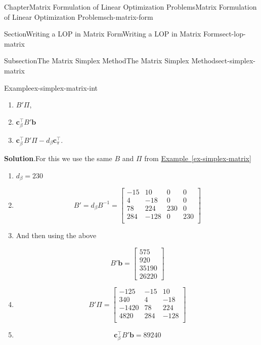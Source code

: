 \documentclass[oneside,10pt,]{book}
\newcommand{\blocktitlefont}{\relax}
\newcommand{\xreffont}{\relax}
\numberwithin{equation}{section}
\newcommand{\amp}{&}
\begin{document}
\begin{chapterptx}{Chapter}{Matrix Formulation of Linear Optimization Problems}{}{Matrix Formulation of Linear Optimization Problems}{}{}{ch-matrix-form}
\begin{sectionptx}{Section}{Writing a LOP in Matrix Form}{}{Writing a LOP in Matrix Form}{}{}{sect-lop-matrix}
\begin{subsectionptx}{Subsection}{The Matrix Simplex Method}{}{The Matrix Simplex Method}{}{}{sect-simplex-matrix}
\begin{example}{Example}{}{ex-simplex-matrix-int}
\begin{enumerate}
\item{}\(B'\Pi\),%
\item{}\(\displaystyle \boldsymbol{c}_{\beta}^{\intercal}B'\boldsymbol{b}\)%
\item{}\(\boldsymbol{c}_{\beta}^{\intercal}B'\Pi - d_{\beta} \boldsymbol{c}_{\pi}^{\intercal}\).%
\end{enumerate}
%
\par\smallskip%
\noindent\textbf{\blocktitlefont Solution}.\hypertarget{ex-simplex-matrix-int-2}{}\quad{}For this we use the same \(B\) and \(\Pi\) from \hyperref[ex-simplex-matrix]{Example~{\xreffont\ref{ex-simplex-matrix}}}%
\par
%
\begin{enumerate}
\item{}\(\displaystyle d_{\beta} = 230\)%
\item{}%
\begin{equation*}
B' = d_{\beta} B^{-1} = \begin{bmatrix} -15  \amp  10  \amp  0  \amp  0 \\ 4 \amp  -18 \amp   0 \amp   0 \\ 78 \amp  224 \amp 230 \amp   0 \\ 284 \amp -128 \amp   0 \amp 230 \\ \end{bmatrix}
\end{equation*}
%
\item{}And then using the above%
\par
%
\begin{equation*}
B'\boldsymbol{b} = \begin{bmatrix} 575 \\ 920 \\ 35190 \\ 26220 \end{bmatrix}
\end{equation*}
%
\item{}%
\begin{equation*}
B' \Pi = \begin{bmatrix} -125 \amp -15 \amp   10 \\ 340 \amp   4 \amp  -18 \\ -1420 \amp  78 \amp  224 \\ 4820 \amp 284 \amp -128 \\ \end{bmatrix}
\end{equation*}
%
\item{}%
\begin{equation*}
\boldsymbol{c}_{\beta}^{\intercal} B' \boldsymbol{b} = 89240

\end{equation*}
\end{enumerate}
\end{example}
\end{subsectionptx}
\end{sectionptx}
\end{chapterptx}
\end{document}
